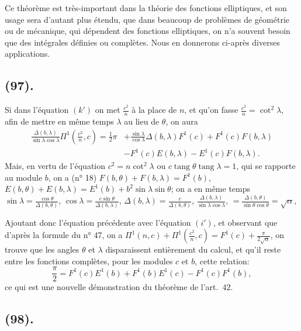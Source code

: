 \documentclass{article}
\begin{document}
Ce théorème est très-important dans la théorie des fonctions elliptiques, et son usage sera d'autant plus étendu, que dans beaucoup de problèmes de géométrie ou de mécanique, qui dépendent des fonctions elliptiques, on n'a souvent besoin que des intégrales définies ou complètes. Nous en donnerons ci-après diverses applications.

\subsection*{(97).}

Si dans l'équation $(k')$ on met $\frac{c^{2}}{n}$ à la place de $n$, et qu'on fasse $\frac{c^{2}}{n}=\cot^{2}\lambda$, afin de mettre en même temps $\lambda$ au lieu de $\theta$, on aura
\[ \begin{aligned} \frac{\Delta(b,\lambda)}{\sin\lambda\cos\lambda}\Pi^{1}\left(\frac{c^{2}}{n},c\right)=\tfrac{1}{2}\pi&+\frac{\sin\lambda}{\cos\lambda}\Delta(b,\lambda)F^{1}(c)+F^{1}(c)F(b,\lambda)\\ &-F^{1}(c)E(b,\lambda)-E^{1}(c)F(b,\lambda). \end{aligned} \]
Mais, en vertu de l'équation $c^{2}=n\cot^{2}\lambda$ ou $c\operatorname{tang}\theta\operatorname{tang}\lambda=1$, qui se rapporte au module $b$, on a (n° 18) $F(b,\theta)+F(b,\lambda)=F^{1}(b)$, $E(b,\theta)+E(b,\lambda)=E^{1}(b)+b^{2}\sin\lambda\sin\theta$; on a en même temps $\sin\lambda=\frac{\cos\theta}{\Delta(b,\theta)}$, $\cos\lambda=\frac{c\sin\theta}{\Delta(b,\lambda)}$, $\Delta(b,\lambda)=\frac{c}{\Delta(b,\theta)}$, $\frac{\Delta(b,\lambda)}{\sin\lambda\cos\lambda}$, $=\frac{\Delta(b,\theta)}{\sin\theta\cos\theta}=\sqrt{\alpha}$,

Ajoutant donc l'équation précédente avec l'équation $(i')$, et observant que d'après la formule du n° 47, on a $\Pi^{1}(n,c)+\Pi^{1}\left(\frac{c^{2}}{n},c\right)=F^{1}(c)+\frac{\pi}{2\sqrt{\alpha}}$, on trouve que les angles $\theta$ et $\lambda$ disparaissent entièrement du calcul, et qu'il reste entre les fonctions complètes, pour les modules $c$ et $b$, cette relation:
\[ \frac{\pi}{2}=F^{1}(c)E^{1}(b)+F^{1}(b)E^{1}(c)-F^{1}(c)F^{1}(b), \]
ce qui est une nouvelle démonstration du théorème de l'art.\ 42.

\subsection*{(98).}
\end{document}
